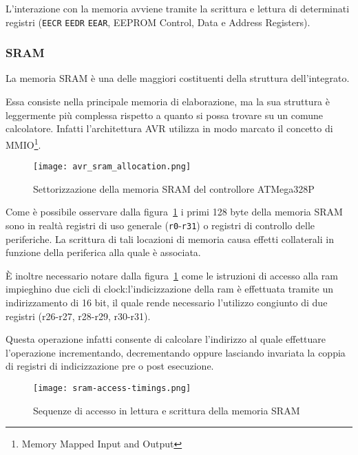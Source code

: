 L'interazione con la memoria avviene tramite la scrittura e lettura di determinati registri (\texttt{EECR} \texttt{EEDR} \texttt{EEAR}, EEPROM Control, Data e Address Registers)\cite{avr:m328p}.

\subsubsection{SRAM}
La memoria SRAM è una delle maggiori costituenti della struttura dell'integrato.

Essa consiste nella principale memoria di elaborazione, ma la sua struttura è leggermente più complessa rispetto a quanto si possa trovare su un comune calcolatore.
Infatti l'architettura AVR utilizza in modo marcato il concetto di MMIO\footnote{Memory Mapped Input and Output}.

\begin{figure}[b]
    \centering
    \texttt{[image: avr\_sram\_allocation.png]}
    \caption[Immagine ottenuta dal documento~\cite{avr:m328p}, fig. 8-3]{Settorizzazione della memoria SRAM del controllore ATMega328P\cite{avr:m328p}}\label{fig:avr-sram-alloc}
\end{figure}

Come è possibile osservare dalla figura~\ref{fig:avr-sram-alloc} i primi 128 byte della memoria SRAM sono in realtà registri di uso generale (\texttt{r0}-\texttt{r31}) o registri di controllo delle periferiche.
La scrittura di tali locazioni di memoria causa effetti collaterali in funzione della periferica alla quale è associata.

È inoltre necessario notare dalla figura~\ref{fig:avr-sram-alloc} come le istruzioni di accesso alla ram impieghino due cicli di clock:l'indicizzazione della ram è effettuata tramite un indirizzamento di 16 bit, il quale rende necessario l'utilizzo congiunto di due registri (r26-r27, r28-r29, r30-r31). 

Questa operazione infatti consente di calcolare l'indirizzo al quale effettuare l'operazione incrementando, decrementando oppure lasciando invariata la coppia di registri di indicizzazione pre o post esecuzione.

\begin{figure}[t]
    \centering
    \texttt{[image: sram-access-timings.png]}
    \caption[Immagine rielaborata a partire dalla fig. 8-4 del documento~\cite{avr:m328p}]{Sequenze di accesso in lettura e scrittura della memoria SRAM\cite{avr:m328p}}\label{fig:avr-sram-timings}
\end{figure}

